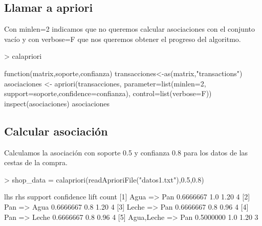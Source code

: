 \documentclass [a4paper] {article}
\begin{document}
\subsection{Llamar a apriori}
Con minlen=2 indicamos que no queremos calcular asociaciones con el conjunto vacío y con verbose=F que nos queremos obtener el progreso del algoritmo.
\begin{Schunk}
\begin{Sinput}
> calapriori
\end{Sinput}
\begin{Soutput}
function(matrix,soporte,confianza){
    transacciones<-as(matrix,"transactions")
    asociaciones <- apriori(transacciones, 
        parameter=list(minlen=2, support=soporte,confidence=confianza), 
        control=list(verbose=F))
    inspect(asociaciones)
    asociaciones
}
\end{Soutput}
\end{Schunk}

\subsection{Calcular asociación}
Calculamos la asociación con soporte 0.5 y confianza 0.8 para los datos de las cestas de la compra.

\begin{Schunk}
\begin{Sinput}
> shop_data = calapriori(readAprioriFile("datos1.txt"),0.5,0.8)
\end{Sinput}
\begin{Soutput}
    lhs             rhs     support   confidence lift count
[1] {Agua}       => {Pan}   0.6666667 1.0        1.20 4    
[2] {Pan}        => {Agua}  0.6666667 0.8        1.20 4    
[3] {Leche}      => {Pan}   0.6666667 0.8        0.96 4    
[4] {Pan}        => {Leche} 0.6666667 0.8        0.96 4    
[5] {Agua,Leche} => {Pan}   0.5000000 1.0        1.20 3    
\end{Soutput}
\end{Schunk}
\end{document}
